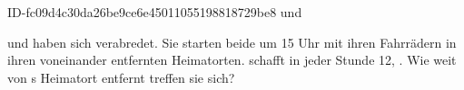 \begin{exercise}
      {ID-fc09d4c30da26be9ce6e45011055198818729be8}
      {\xya{} und \xyb}
  \ifproblem\problem\par
    \xya{} und \xyb{} haben sich verabredet. Sie starten beide um 15 Uhr mit ihren
    Fahrrädern in ihren  voneinander entfernten Heimatorten. \xya{} schafft
    in jeder Stunde 12, \xyb{} . Wie weit von \xya s Heimatort entfernt
    treffen sie sich?
  \fi
\end{exercise}
